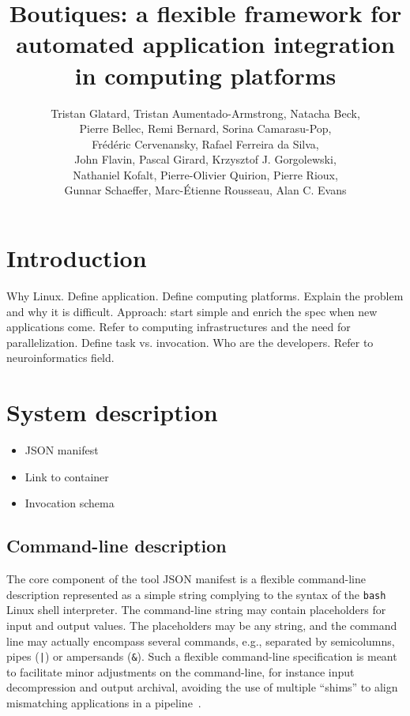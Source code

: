 \documentclass{article}
\title{Boutiques: a flexible framework for automated application integration in computing platforms}
\begin{document}
\author{Tristan Glatard, Tristan Aumentado-Armstrong, Natacha Beck, \\
  Pierre Bellec, Remi Bernard, Sorina Camarasu-Pop, \\
  Fr\'ed\'eric Cervenansky, Rafael Ferreira da Silva, \\ 
  John Flavin, Pascal Girard, Krzysztof J. Gorgolewski, \\
  Nathaniel Kofalt, Pierre-Olivier Quirion, Pierre Rioux, \\
  Gunnar Schaeffer, Marc-\'Etienne Rousseau, Alan C. Evans}

\maketitle

\section{Introduction}

Why Linux. Define application. Define computing platforms. Explain the
problem and why it is difficult. Approach: start simple and enrich the
spec when new applications come. Refer to computing infrastructures
and the need for parallelization. Define task vs. invocation. Who are
the developers. Refer to neuroinformatics field.

\section{System description}

\begin{itemize}
\item JSON manifest
\item Link to container
\item Invocation schema
\end{itemize}

\subsection{Command-line description}

The core component of the tool JSON manifest is a flexible
command-line description represented as a simple string complying to
the syntax of the \texttt{bash} Linux shell interpreter. The
command-line string may contain placeholders for input and output
values. The placeholders may be any string, and the command line may
actually encompass several commands, e.g., separated by semicolumns,
pipes (\texttt{|}) or ampersands (\texttt{\&}). Such a flexible
command-line specification is meant to facilitate minor adjustments on
the command-line, for instance input decompression and output
archival, avoiding the use of multiple ``shims'' to align mismatching
applications in a pipeline~\cite{hull2004treating}.
\end{document}
